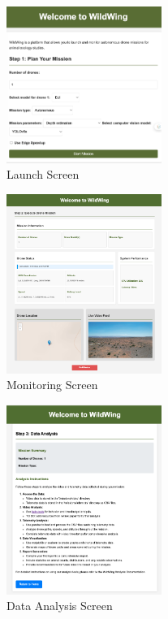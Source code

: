 \documentclass[final,5p,times,twocolumn]{elsarticle}
\begin{document}
\begin{figure}
    \centering
    \includegraphics[width=0.45\textwidth]{figures/ww3.png}
    \caption{Launch Screen}
    \label{fig:fig1}
\end{figure}

\begin{figure}
    \centering
    \includegraphics[width=0.45\textwidth]{figures/ww1.png}
    \caption{Monitoring Screen}
    \label{fig:fig2}
\end{figure}

\begin{figure}
    \centering
    \includegraphics[width=0.45\textwidth]{figures/ww2.png}
     \caption{Data Analysis Screen}
    \label{fig:fig3}
\end{figure}
\end{document}
